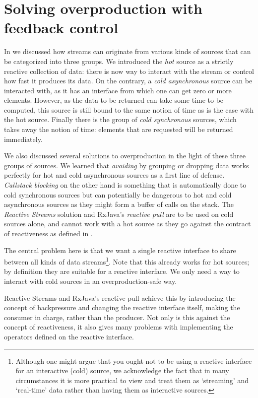\chapter{Solving overproduction with feedback control}
\label{chap:solving-overproduction}

In  we discussed how streams can originate from various kinds of sources that can be categorized into three groups. We introduced the \textit{hot} source as a strictly reactive collection of data: there is now way to interact with the stream or control how fast it produces its data. On the contrary, a \textit{cold asynchronous} source can be interacted with, as it has an interface from which one can get zero or more elements. However, as the data to be returned can take some time to be computed, this source is still bound to the same notion of time as is the case with the hot source. Finally there is the group of \textit{cold synchronous} sources, which takes away the notion of time: elements that are requested will be returned immediately.

We also discussed several solutions to overproduction in the light of these three groups of sources. We learned that \textit{avoiding} by grouping or dropping data works perfectly for hot and cold asynchronous sources as a first line of defense. \textit{Callstack blocking} on the other hand is something that is automatically done to cold synchronous sources but can potentially be dangerous to hot and cold asynchronous sources as they might form a buffer of calls on the stack. The \textit{Reactive Streams} solution and RxJava's \textit{reactive pull} are to be used on cold sources alone, and cannot work with a hot source as they go against the contract of reactiveness as defined in \cite{berry1991-Reactive}.

The central problem here is that we want a single reactive interface to share between all kinds of data streams\footnote{Although one might argue that you ought not to be using a reactive interface for an interactive (cold) source, we acknowledge the fact that in many circumstances it is more practical to view and treat them as `streaming' and `real-time' data rather than having them as interactive sources.}. Note that this already works for hot sources; by definition they are suitable for a reactive interface. We only need a way to interact with cold sources in an overproduction-safe way.

Reactive Streams and RxJava's reactive pull achieve this by introducing the concept of backpressure and changing the reactive interface itself, making the consumer in charge, rather than the producer. Not only is this against the concept of reactiveness, it also gives many problems with implementing the operators defined on the reactive interface.

